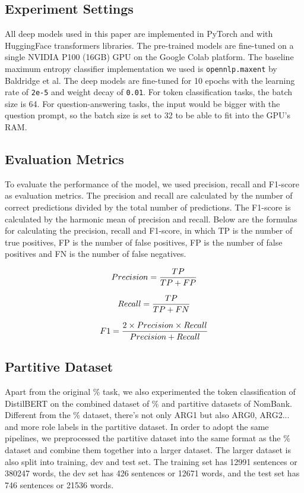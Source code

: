 \documentclass[11pt]{article}
\begin{document}
\subsection{Experiment Settings}

All deep models used in this paper are implemented in PyTorch and with HuggingFace transformers libraries. The pre-trained models are fine-tuned on a single NVIDIA P100 (16GB) GPU on the Google Colab platform. The baseline maximum entropy classifier implementation we used is \verb|opennlp.maxent| by Baldridge et al. The deep models are fine-tuned for 10 epochs with the learning rate of \verb|2e-5| and weight decay of \verb|0.01|. For token classification tasks, the batch size is 64. For question-answering tasks, the input would be bigger with the question prompt, so the batch size is set to 32 to be able to fit into the GPU's RAM.

\subsection{Evaluation Metrics}

To evaluate the performance of the model, we used precision, recall and F1-score as evaluation metrics. The precision and recall are calculated by the number of correct predictions divided by the total number of predictions. The F1-score is calculated by the harmonic mean of precision and recall. Below are the formulas for calculating the precision, recall and F1-score, in which TP is the number of true positives, FP is the number of false positives, FP is the number of false positives and FN is the number of false negatives.

\begin{equation}
  Precision={TP\over{TP+FP}}
\end{equation}

\begin{equation}
  Recall={TP\over{TP+FN}}
\end{equation}

\begin{equation}
  F1={2\times{Precision}\times{Recall}\over{Precision+Recall}}
\end{equation}

\subsection{Partitive Dataset}

Apart from the original \% task, we also experimented the token classification of DistilBERT on the combined dataset of \% and partitive datasets of NomBank. Different from the \% dataset, there's not only ARG1 but also ARG0, ARG2... and more role labels in the partitive dataset. In order to adopt the same pipelines, we preprocessed the partitive dataset into the same format as the \% dataset and combine them together into a larger dataset. The larger dataset is also split into training, dev and test set. The training set has 12991 sentences or 380247 words, the dev set has 426 sentences or 12671 words, and the test set has 746 sentences or 21536 words.
\end{document}

